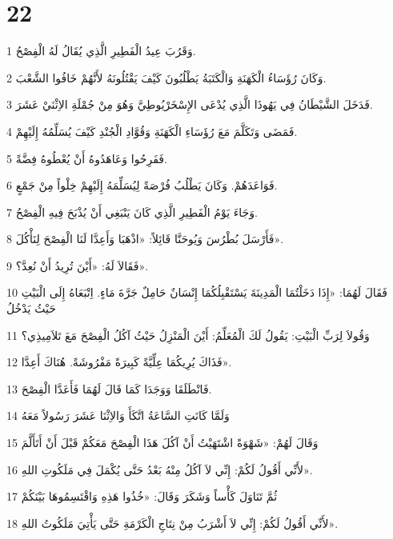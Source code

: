 \chapter{22}

\par 1 وَقَرُبَ عِيدُ الْفَطِيرِ الَّذِي يُقَالُ لَهُ الْفِصْحُ.
\par 2 وَكَانَ رُؤَسَاءُ الْكَهَنَةِ وَالْكَتَبَةُ يَطْلُبُونَ كَيْفَ يَقْتُلُونَهُ لأَنَّهُمْ خَافُوا الشَّعْبَ.
\par 3 فَدَخَلَ الشَّيْطَانُ فِي يَهُوذَا الَّذِي يُدْعَى الإِسْخَرْيُوطِيَّ وَهُوَ مِنْ جُمْلَةِ الاِثْنَيْ عَشَرَ.
\par 4 فَمَضَى وَتَكَلَّمَ مَعَ رُؤَسَاءِ الْكَهَنَةِ وَقُوَّادِ الْجُنْدِ كَيْفَ يُسَلِّمُهُ إِلَيْهِمْ.
\par 5 فَفَرِحُوا وَعَاهَدُوهُ أَنْ يُعْطُوهُ فِضَّةً.
\par 6 فَوَاعَدَهُمْ. وَكَانَ يَطْلُبُ فُرْصَةً لِيُسَلِّمَهُ إِلَيْهِمْ خِلْواً مِنْ جَمْعٍ.
\par 7 وَجَاءَ يَوْمُ الْفَطِيرِ الَّذِي كَانَ يَنْبَغِي أَنْ يُذْبَحَ فِيهِ الْفِصْحُ.
\par 8 فَأَرْسَلَ بُطْرُسَ وَيُوحَنَّا قَائِلاً: «اذْهَبَا وَأَعِدَّا لَنَا الْفِصْحَ لِنَأْكُلَ».
\par 9 فَقَالاَ لَهُ: «أَيْنَ تُرِيدُ أَنْ نُعِدَّ؟».
\par 10 فَقَالَ لَهُمَا: «إِذَا دَخَلْتُمَا الْمَدِينَةَ يَسْتَقْبِلُكُمَا إِنْسَانٌ حَامِلٌ جَرَّةَ مَاءٍ. اِتْبَعَاهُ إِلَى الْبَيْتِ حَيْثُ يَدْخُلُ
\par 11 وَقُولاَ لِرَبِّ الْبَيْتِ: يَقُولُ لَكَ الْمُعَلِّمُ: أَيْنَ الْمَنْزِلُ حَيْثُ آكُلُ الْفِصْحَ مَعَ تَلاَمِيذِي؟
\par 12 فَذَاكَ يُرِيكُمَا عِلِّيَّةً كَبِيرَةً مَفْرُوشَةً. هُنَاكَ أَعِدَّا».
\par 13 فَانْطَلَقَا وَوَجَدَا كَمَا قَالَ لَهُمَا فَأَعَدَّا الْفِصْحَ.
\par 14 وَلَمَّا كَانَتِ السَّاعَةُ اتَّكَأَ وَالاِثْنَا عَشَرَ رَسُولاً مَعَهُ
\par 15 وَقَالَ لَهُمْ: «شَهْوَةً اشْتَهَيْتُ أَنْ آكُلَ هَذَا الْفِصْحَ مَعَكُمْ قَبْلَ أَنْ أَتَأَلَّمَ
\par 16 لأَنِّي أَقُولُ لَكُمْ: إِنِّي لاَ آكُلُ مِنْهُ بَعْدُ حَتَّى يُكْمَلَ فِي مَلَكُوتِ اللهِ».
\par 17 ثُمَّ تَنَاوَلَ كَأْساً وَشَكَرَ وَقَالَ: «خُذُوا هَذِهِ وَاقْتَسِمُوهَا بَيْنَكُمْ
\par 18 لأَنِّي أَقُولُ لَكُمْ: إِنِّي لاَ أَشْرَبُ مِنْ نِتَاجِ الْكَرْمَةِ حَتَّى يَأْتِيَ مَلَكُوتُ اللهِ».

